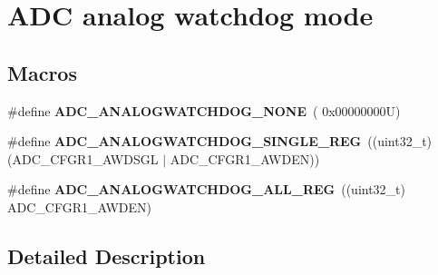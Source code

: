 \hypertarget{group___a_d_c__analog__watchdog__mode}{}\section{A\+DC analog watchdog mode}
\label{group___a_d_c__analog__watchdog__mode}
\subsection*{Macros}
\begin{DoxyCompactItemize}
\item 
\mbox{\label{group___a_d_c__analog__watchdog__mode_gad173f9dd01d4585c9b7c8c324de399c0}} 
\#define {\bfseries A\+D\+C\+\_\+\+A\+N\+A\+L\+O\+G\+W\+A\+T\+C\+H\+D\+O\+G\+\_\+\+N\+O\+NE}~( 0x00000000\+U)
\item 
\mbox{\label{group___a_d_c__analog__watchdog__mode_gad4cf176e721fd2382fbc7937e352db67}} 
\#define {\bfseries A\+D\+C\+\_\+\+A\+N\+A\+L\+O\+G\+W\+A\+T\+C\+H\+D\+O\+G\+\_\+\+S\+I\+N\+G\+L\+E\+\_\+\+R\+EG}~((uint32\+\_\+t)(A\+D\+C\+\_\+\+C\+F\+G\+R1\+\_\+\+A\+W\+D\+S\+GL $\vert$ A\+D\+C\+\_\+\+C\+F\+G\+R1\+\_\+\+A\+W\+D\+EN))
\item 
\mbox{\label{group___a_d_c__analog__watchdog__mode_gad9d25140644089dd34084cb4dfa7ebd8}} 
\#define {\bfseries A\+D\+C\+\_\+\+A\+N\+A\+L\+O\+G\+W\+A\+T\+C\+H\+D\+O\+G\+\_\+\+A\+L\+L\+\_\+\+R\+EG}~((uint32\+\_\+t) A\+D\+C\+\_\+\+C\+F\+G\+R1\+\_\+\+A\+W\+D\+EN)
\end{DoxyCompactItemize}


\subsection{Detailed Description}
